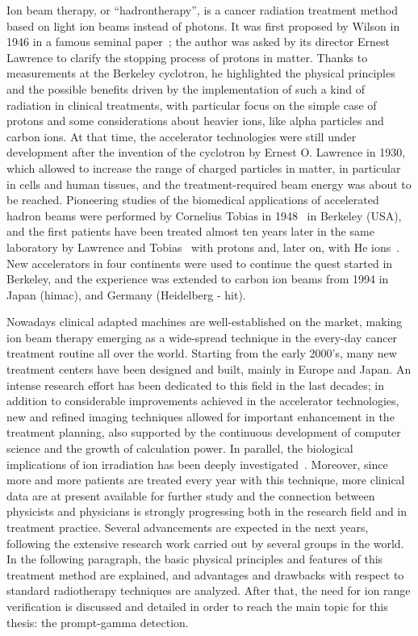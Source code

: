 Ion beam therapy, or \enquote{hadrontherapy}, is a cancer radiation treatment method based on light ion beams instead of photons. It was first proposed by Wilson in 1946 in a famous seminal paper~\parencite{Wilson1946}; the author was asked by its director Ernest Lawrence to clarify the stopping process of protons in matter. Thanks to measurements at the Berkeley cyclotron, he highlighted the physical principles and the possible benefits driven by the implementation of such a kind of radiation in clinical treatments, with particular focus on the simple case of protons and some considerations about heavier ions, like alpha particles and carbon ions.  At that time, the accelerator technologies were still under development after the invention of the cyclotron by Ernest O. Lawrence in 1930, which allowed to increase the range of charged particles in matter, in particular in cells and human tissues, and the treatment-required beam energy was about to be reached. Pioneering studies of the biomedical applications of accelerated hadron beams were performed by Cornelius Tobias in 1948~\parencite{Blakely2009} in Berkeley (USA), and the first patients have been treated almost ten years later in the same laboratory by Lawrence and Tobias~\parencite{Tobias1955, Tobias1958} with protons and, later on, with He ions~\parencite{Halperin2006}. New accelerators in four continents were used to continue the quest started in Berkeley, and the experience was extended to carbon ion beams from 1994 in Japan (\gls{himac}), and Germany (Heidelberg - \gls{hit}). 

Nowadays clinical adapted machines are well-established on the market, making ion beam therapy emerging as a wide-spread technique in the every-day cancer treatment routine all over the world. Starting from the early 2000's, many new treatment centers have been designed and built, mainly in Europe and Japan. An intense research effort has been dedicated to this field in the last decades; in addition to considerable improvements achieved in the accelerator technologies, new and refined imaging techniques allowed for important enhancement in the treatment planning, also supported by the continuous development of computer science and the growth of calculation power. In parallel, the biological implications of ion irradiation has been deeply investigated~\parencite{Tobias1982, Brahme2004, Friedrich2012, }. Moreover, since more and more patients are treated every year with this technique, more clinical data are at present available for further study and the connection between physicists and physicians is strongly progressing both in the research field and in treatment practice. Several advancements are expected in the next years, following the extensive research work carried out by several groups in the world. In the following paragraph, the basic physical principles and features of this treatment method are explained, and advantages and drawbacks with respect to standard radiotherapy techniques are analyzed. After that, the need for ion range verification is discussed and detailed in order to reach the main topic for this thesis: the prompt-gamma detection.   

